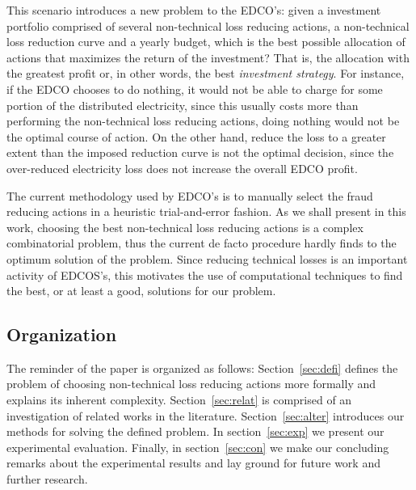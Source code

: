 This scenario introduces a new problem to the EDCO's: given a investment portfolio comprised of 
several non-technical loss reducing actions, a non-technical loss reduction curve and a yearly budget, which is the best possible 
allocation of actions that maximizes the return of the investment? That is, the 
allocation with the greatest profit or, in other words, the best \textit{investment strategy}.
For instance, if the EDCO chooses to do nothing, it would not be able to charge for some portion of the
distributed electricity,
since this usually costs more than performing the non-technical loss reducing actions, doing nothing would not
be the optimal course of action. On the other hand, reduce the loss to a greater extent than the
imposed reduction curve is not the optimal decision, since the over-reduced electricity loss does not
increase the overall EDCO profit.

The current methodology used by EDCO's is to manually select the fraud reducing actions in
a heuristic trial-and-error fashion. As we shall present in this work, choosing the best non-technical loss reducing actions is
a complex combinatorial problem, thus the current de facto procedure hardly finds to the optimum solution of the problem.
Since reducing technical losses is an important activity of EDCOS's, this motivates the use of computational techniques to find the best, or at least a good, solutions for our problem.


\subsection{Organization}
The reminder of the paper is organized as follows: Section~\ref{sec:defi} defines the
problem of choosing non-technical loss reducing actions more formally and explains its inherent complexity.
Section~\ref{sec:relat} is comprised of an investigation of related works in the literature.
Section~\ref{sec:alter} introduces our methods for solving the defined problem. 
In section~\ref{sec:exp} we present our experimental evaluation. Finally, in section~\ref{sec:con} 
we make our concluding remarks about the experimental results and lay ground 
for future work and further research.

                 
